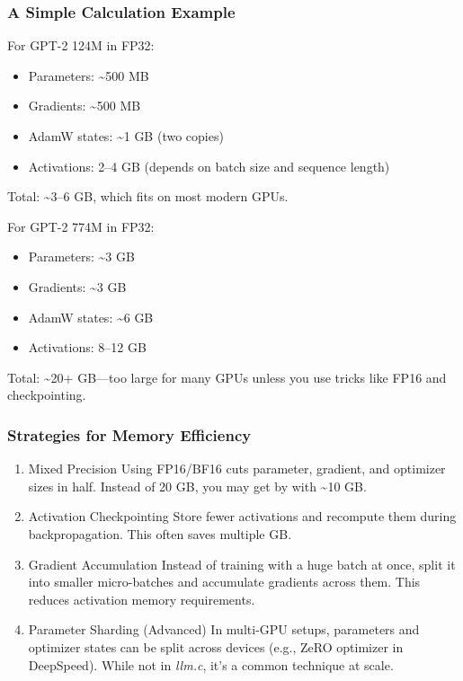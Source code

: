 \documentclass[
  letterpaper,
  DIV=11,
  numbers=noendperiod]{scrreprt}
\providecommand{\tightlist}{%
  \setlength{\itemsep}{0pt}\setlength{\parskip}{0pt}}
\begin{document}
\subsubsection{A Simple Calculation
Example}\label{a-simple-calculation-example}

For GPT-2 124M in FP32:

\begin{itemize}
\tightlist
\item
  Parameters: \textasciitilde500 MB
\item
  Gradients: \textasciitilde500 MB
\item
  AdamW states: \textasciitilde1 GB (two copies)
\item
  Activations: 2--4 GB (depends on batch size and sequence length)
\end{itemize}

Total: \textasciitilde3--6 GB, which fits on most modern GPUs.

For GPT-2 774M in FP32:

\begin{itemize}
\tightlist
\item
  Parameters: \textasciitilde3 GB
\item
  Gradients: \textasciitilde3 GB
\item
  AdamW states: \textasciitilde6 GB
\item
  Activations: 8--12 GB
\end{itemize}

Total: \textasciitilde20+ GB---too large for many GPUs unless you use
tricks like FP16 and checkpointing.

\subsubsection{Strategies for Memory
Efficiency}\label{strategies-for-memory-efficiency}

\begin{enumerate}
\def\labelenumi{\arabic{enumi}.}
\item
  Mixed Precision Using FP16/BF16 cuts parameter, gradient, and
  optimizer sizes in half. Instead of 20 GB, you may get by with
  \textasciitilde10 GB.
\item
  Activation Checkpointing Store fewer activations and recompute them
  during backpropagation. This often saves multiple GB.
\item
  Gradient Accumulation Instead of training with a huge batch at once,
  split it into smaller micro-batches and accumulate gradients across
  them. This reduces activation memory requirements.
\item
  Parameter Sharding (Advanced) In multi-GPU setups, parameters and
  optimizer states can be split across devices (e.g., ZeRO optimizer in
  DeepSpeed). While not in \emph{llm.c}, it's a common technique at
  scale.
\end{enumerate}
\end{document}
